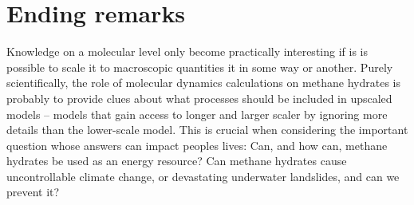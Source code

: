 \section{Ending remarks}
Knowledge on a molecular level only become practically interesting if is is possible to scale it to macroscopic quantities it in some way or another. Purely scientifically, the role of molecular dynamics calculations on methane hydrates is probably to provide clues about what processes should be included in upscaled models -- models that gain access to longer and larger scaler by ignoring more details than the lower-scale model. This is crucial when considering the important question whose answers can impact peoples lives: Can, and how can, methane hydrates be used as an energy resource? Can methane hydrates cause uncontrollable climate change, or devastating underwater landslides, and can we prevent it? 